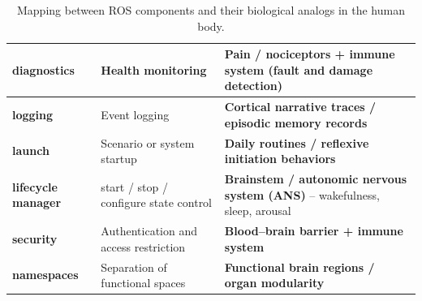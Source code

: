 \documentclass{book}
\begin{document}
\begin{table}[h!]
{\begin{tabular}{|>{\raggedright\arraybackslash}p{3cm}|>{\raggedright\arraybackslash}p{4cm}|>{\raggedright\arraybackslash}p{8.5cm}|}
                \hline
                \textbf{diagnostics}                & Health monitoring                      & \textbf{Pain / nociceptors + immune system} (fault and damage detection)                                            \\
                \hline
                \textbf{logging}                    & Event logging                          & \textbf{Cortical narrative traces / episodic memory records}                                                        \\
                \hline
                \textbf{launch}                     & Scenario or system startup             & \textbf{Daily routines / reflexive initiation behaviors}                                                            \\
                \hline
                \textbf{lifecycle manager}          & start / stop / configure state control & \textbf{Brainstem / autonomic nervous system (ANS)} – wakefulness, sleep, arousal                                   \\
                \hline
                \textbf{security}                   & Authentication and access restriction  & \textbf{Blood–brain barrier + immune system}                                                                        \\
                \hline
                \textbf{namespaces}                 & Separation of functional spaces        & \textbf{Functional brain regions / organ modularity}                                                                \\
                \hline
            \end{tabular}
        }
        \caption{Mapping between ROS components and their biological analogs in the human body.}
        \label{tab:ros_human_mapping}
    \end{table}
\end{document}
